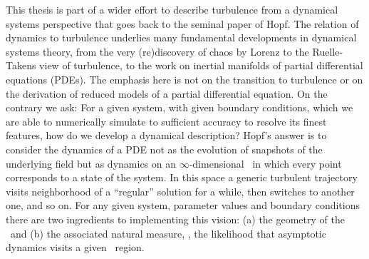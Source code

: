 


%




This thesis is part of a wider effort to describe
turbulence from a dynamical systems perspective that goes back
to the seminal paper of Hopf. The relation of
dynamics to turbulence underlies many fundamental developments
in dynamical systems theory, from the very (re)discovery of
chaos by Lorenz to the Ruelle-Takens
view of turbulence, to the work on inertial
manifolds of partial differential
equations (PDEs). The emphasis here is not on the transition to
turbulence or on the derivation of reduced models of a partial
differential equation. On the contrary we ask: For a given
system, with given boundary conditions, which we are able to
numerically simulate to sufficient accuracy
to resolve its finest features, how do we develop a dynamical
description? Hopf's answer
is to consider the dynamics of a PDE not as the evolution of
snapshots of the underlying field but as dynamics on an
$\infty$-dimensional \statesp\ in which every point
corresponds to a state of the system. In this space a generic turbulent
trajectory visits neighborhood of a ``regular'' solution for a while, then
switches to another one, and so on. For any given system,
parameter values and boundary conditions there are two
ingredients to implementing this vision: (a) the geometry of
the \statesp\ and (b) the associated natural measure, \ie, the
likelihood that asymptotic dynamics visits a given \statesp\
region. 

